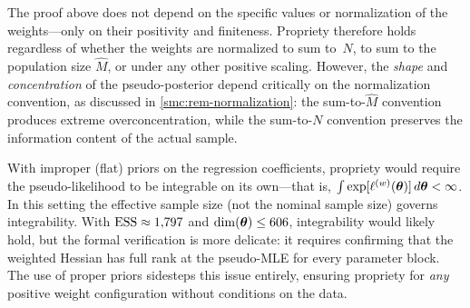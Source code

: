 \begin{remark}
\label{smc:rem-weight-invariance}
  The proof above does not depend on the specific values or
  normalization of the weights---only on their positivity and
  finiteness.  Propriety therefore holds regardless of whether the
  weights are normalized to sum to~$N$, to sum to the population size
  $\hat{M}$, or under any other positive scaling.  However, the
  \emph{shape} and \emph{concentration} of the pseudo-posterior depend
  critically on the normalization convention, as discussed in
  \cref{smc:rem-normalization}: the sum-to-$\hat{M}$ convention
  produces extreme overconcentration, while the sum-to-$N$ convention
  preserves the information content of the actual sample.
\end{remark}

\begin{remark}
\label{smc:rem-improper-priors}
  With improper (flat) priors on the regression coefficients,
  propriety would require the pseudo-likelihood to be integrable on
  its own---that is, $\int \exp[\ell^{(w)}(\boldsymbol{\theta})]\,d\boldsymbol{\theta} < \infty$.
  In this setting the effective sample size (not the nominal sample
  size) governs integrability.  With $\text{ESS} \approx 1{,}797$ and
  $\dim(\boldsymbol{\theta}) \le 606$, integrability would likely hold, but the
  formal verification is more delicate: it requires confirming that the
  weighted Hessian has full rank at the pseudo-MLE for every parameter
  block.  The use of proper priors sidesteps this issue entirely,
  ensuring propriety for \emph{any} positive weight configuration
  without conditions on the data.
\end{remark}
